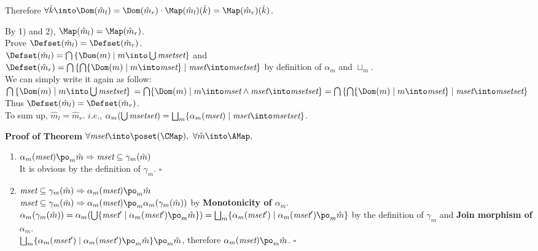 \begin{itemize}
\begin{enumerate}[label={\arabic*)}]
Therefore $\forall \hat{k} \into \Dom(\hat{m}_l) = \Dom(\hat{m}_r) \cdot
\Map(\hat{m}_l)(\hat{k}) = \Map(\hat{m}_r)(\hat{k})$.
\end{enumerate}
By 1) and 2), $\Map(\hat{m}_l) = \Map(\hat{m}_r)$. \vspace{2mm} \\
Prove $\Defset(\hat{m}_l) = \Defset(\hat{m}_r)$. \vspace{1mm} \\
$\Defset(\hat{m}_l) = \bigcap \left \{ \Dom(m) \mid m \into
\bigcup \emph{msetset} \right \}$ and \\
$\Defset(\hat{m}_r) = \bigcap \left \{ \bigcap \{ \Dom(m) \mid m \into \emph{mset} \} \mid
\emph{mset} \into \emph{msetset} \right \}$ by definition of $\alpha_m$ and $\sqcup_m$. \vspace{1mm} \\
We can simply write it again as follow: \vspace{1mm} \\
$\bigcap \left \{ \Dom(m) \mid m \into \bigcup \emph{msetset} \right \} \\
= \bigcap \{ \Dom(m) \mid m \into \emph{mset} \land \emph{mset} \into \emph{msetset} \} \\
= \bigcap \left \{ \bigcap \{ \Dom(m) \mid m \into \emph{mset} \} \mid \emph{mset} \into \emph{msetset} \right \}$
\vspace{1mm} \\
Thus $\Defset(\hat{m}_l) = \Defset(\hat{m}_r)$. \vspace{1mm} \\
To sum up, $\hat{m}_l = \hat{m}_r$. $i.e.$, 
$\alpha_m(\bigcup \emph{msetset} )
=\bigsqcup_m\{ \alpha_m(\emph{mset}) \mid \emph{mset} \into \emph{msetset}\}$.
\end{itemize}
\textbf{Proof of Theorem }
$\forall \emph{mset} \into \poset(\CMap), ~
\forall \hat{m} \into \AMap, ~$
\begin{enumerate}[label={(\arabic*)}]
\item
$\alpha_m(\emph{mset}) \po_m \hat{m}
\Rightarrow
\emph{mset} \subseteq \gamma_m(\hat{m})$ \\
It is obvious by the definition of $\gamma_m$. \hfill $\square$
\item
$\emph{mset} \subseteq \gamma_m(\hat{m})
\Rightarrow
\alpha_m(\emph{mset}) \po_m \hat{m}$ \\
$\emph{mset} \subseteq \gamma_m(\hat{m})
\Rightarrow \alpha_m(\emph{mset}) \po_m \alpha_m(\gamma_m(\hat{m}))$
by \textbf{Monotonicity of $\alpha_m$}.\\
$\alpha_m(\gamma_m(\hat{m})) = 
\alpha_m(\bigcup\{ \emph{mset}' \mid \alpha_m(\emph{mset}') \po_m \hat{m}\}) = 
\bigsqcup_m\{\alpha_m(\emph{mset}') \mid \alpha_m(\emph{mset}') \po_m \hat{m} \}$
by the definition of $\gamma_m$ and \textbf{Join morphism of $\alpha_m$}. \\
$\bigsqcup_m\{\alpha_m(\emph{mset}') \mid \alpha_m(\emph{mset}') \po_m \hat{m} \}
\po_m \hat{m}$, therefore $\alpha_m(\emph{mset}) \po_m \hat{m}$. \hfill $\square$
\end{enumerate}
